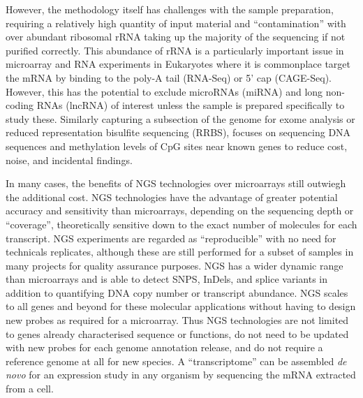 However, %
the methodology itself has challenges with the sample preparation, requiring a relatively high quantity of input material and ``contamination'' with over abundant ribosomal rRNA taking up the majority of the sequencing if not purified correctly. This abundance of rRNA is a particularly important issue in microarray and RNA experiments in Eukaryotes where it is commonplace target the mRNA by binding to the poly-A tail (RNA-Seq) or 5' cap (CAGE-Seq). However, this has the potential to exclude microRNAs (miRNA) and long non-coding RNAs (lncRNA) of interest unless the sample is prepared specifically to study these. Similarly capturing a subsection of the genome for exome analysis or reduced representation bisulfite sequencing (RRBS), focuses on sequencing DNA sequences and methylation levels of CpG sites near known genes to reduce cost, noise, and incidental findings.

In many cases, the benefits of NGS technologies over microarrays still outwiegh the additional cost. NGS technologies have the advantage of greater potential accuracy and sensitivity than microarrays, depending on the sequencing depth or ``coverage'', theoretically sensitive down to the exact number of molecules for each transcript. NGS experiments are regarded as ``reproducible'' with no need for technicals replicates, although these are still performed for a subset of samples in many projects for quality assurance purposes. NGS has a wider dynamic range than microarrays and is able to detect SNPS, InDels, and splice variants in addition to quantifying DNA copy number or transcript abundance. NGS scales to all genes and beyond for these molecular applications without having to design new probes as required for a microarray. Thus NGS technologies are not limited to genes already characterised sequence or functions, do not need to be updated with new probes for each genome annotation release, and do not require a reference genome at all for new species. A ``transcriptome'' can be assembled \textit{de novo} for an expression study in any organism by sequencing the mRNA extracted from a cell.

